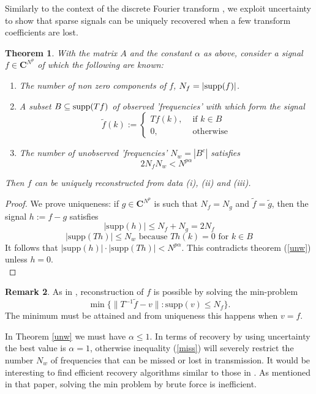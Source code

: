 \documentclass[11pt]{amsart}
\newtheorem{theorem}{Theorem}[section]
\theoremstyle{definition}
\newtheorem{remark}[theorem]{Remark}
\theoremstyle{remark}
\numberwithin{equation}{section}
\newcommand{\suport}{\textup{supp}}
\begin{document}
Similarly to the context of the discrete Fourier transform \cite{DoSt}, we exploit uncertainty to show that sparse signals can be uniquely recovered when a few transform coefficients are lost.
\begin{theorem}\label{recov}  With the matrix $A$ and the constant $\alpha$ as above, consider a signal $f\in\mathbf{C}^{N^p}$  of which the following are known:

\begin{enumerate}
	\item  The number of non zero components of $f$, $N_f=|\suport(f)|$.
	\item A subset $B\subseteq \suport(Tf)$ of observed 'frequencies'  with which form the signal
$$\tilde{f}(k):=  \left\{ \begin{array}{cc}
 Tf(k),    &\text{ if  } k\in B\\
0  ,&\text{ otherwise}
\end{array}\right.
$$
\item The  number of unobserved 'frequencies'  $N_w=|B^c|$ satisfies
 \begin{equation}\label{miss}
 2N_fN_w<N^{p\alpha}
 \end{equation}

\end{enumerate}

Then $f$ can be uniquely reconstructed from data (i), (ii) and (iii).
\end{theorem}
\begin{proof} We prove uniqueness: if $g\in \mathbf{C}^{N^p}$ is such that $N_f=N_g$ and $\tilde{f}=\tilde{g}$, then the signal
$h:=f-g$ satisfies
$$|\text{supp}(h)|\leq N_f+N_g=2N_f$$
$$| \text{supp}(Th)|\leq N_w\text{ because } Th(k)=0\text{ for } k\in B$$
It follows that $ |\text{supp}(h)|\cdot |\text{supp}(Th)| <N^{p\alpha}$. This contradicts theorem (\ref{unw})  unless $h=0$.\\
\end{proof}
\begin{remark}
As in \cite{DoSt}, reconstruction of $f$ is possible by solving the min-problem  $$\min \{ \| T^{-1}\tilde{f}-v\|: \text{supp}(v)\leq N_f  \}.$$ The minimum must be attained and from uniqueness this happens when $v=f$.


In Theorem \ref{unw} we must have $\alpha\leq 1$. In terms of recovery by using uncertainty the best value is $\alpha=1$, otherwise inequality (\ref{miss}) will severely restrict the number $N_w$ of frequencies that can be missed or lost in transmission.
It would be interesting to find efficient recovery algorithms similar to those in \cite{DoSt}. As mentioned in that paper, solving the min problem by brute force is inefficient. \\
\end{remark}
\end{document}
